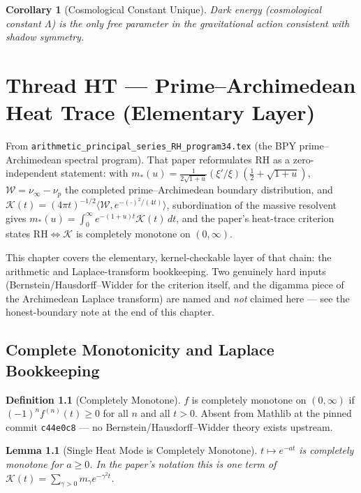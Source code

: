 \documentclass{report}
\newtheorem{lemma}[theorem]{Lemma}
\newtheorem{corollary}[theorem]{Corollary}
\theoremstyle{definition}
\newtheorem{definition}[theorem]{Definition}
\begin{document}
\begin{corollary}[Cosmological Constant Unique]
  \label{cor:lambda-unique}
  Dark energy (cosmological constant $\Lambda$) is the only free parameter
  in the gravitational action consistent with shadow symmetry.
\end{corollary}

\chapter{Thread HT --- Prime--Archimedean Heat Trace (Elementary Layer)}

From \texttt{arithmetic\_principal\_series\_RH\_program34.tex} (the BPY prime--Archimedean
spectral program). That paper reformulates RH as a zero-independent statement: with
$m_*(u) = \tfrac{1}{2\sqrt{1+u}}(\xi'/\xi)(\tfrac12+\sqrt{1+u})$, $\mathcal{W}=\nu_\infty-\nu_p$
the completed prime--Archimedean boundary distribution, and
$\mathcal{K}(t)=(4\pi t)^{-1/2}\langle\mathcal{W},e^{-(\cdot)^2/(4t)}\rangle$, subordination of
the massive resolvent gives $m_*(u)=\int_0^\infty e^{-(1+u)t}\mathcal{K}(t)\,dt$, and the
paper's heat-trace criterion states
$\mathrm{RH} \iff \mathcal{K}$ is completely monotone on $(0,\infty)$.

This chapter covers the elementary, kernel-checkable layer of that chain: the arithmetic and
Laplace-transform bookkeeping. Two genuinely hard inputs (Bernstein/Hausdorff--Widder for the
criterion itself, and the digamma piece of the Archimedean Laplace transform) are named and
\emph{not} claimed here --- see the honest-boundary note at the end of this chapter.

\section{Complete Monotonicity and Laplace Bookkeeping}

\begin{definition}[Completely Monotone]
  \label{def:completely-monotone}
  \leanok
  $f$ is completely monotone on $(0,\infty)$ if $(-1)^n f^{(n)}(t) \geq 0$ for all $n$ and
  all $t>0$. Absent from Mathlib at the pinned commit \texttt{c44e0c8} --- no
  Bernstein/Hausdorff--Widder theory exists upstream.
\end{definition}

\begin{lemma}[Single Heat Mode is Completely Monotone]
  \label{lem:completely-monotone-exp-neg}
  \leanok
  $t \mapsto e^{-at}$ is completely monotone for $a \geq 0$. In the paper's notation this is
  one term of $\mathcal{K}(t)=\sum_{\gamma>0} m_\gamma e^{-\gamma^2 t}$.
\end{lemma}
\end{document}
